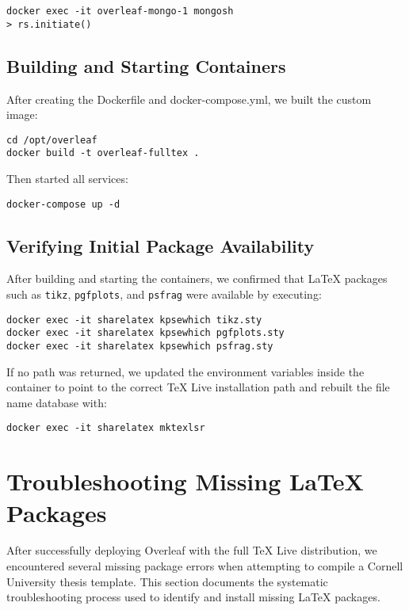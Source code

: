 \begin{verbatim}
docker exec -it overleaf-mongo-1 mongosh
> rs.initiate()
\end{verbatim}

\subsection{Building and Starting Containers}

After creating the Dockerfile and docker-compose.yml, we built the custom image:

\begin{verbatim}
cd /opt/overleaf
docker build -t overleaf-fulltex .
\end{verbatim}

Then started all services:

\begin{verbatim}
docker-compose up -d
\end{verbatim}

\subsection{Verifying Initial Package Availability}

After building and starting the containers, we confirmed that LaTeX packages such as \verb|tikz|, \verb|pgfplots|, and \verb|psfrag| were available by executing:

\begin{verbatim}
docker exec -it sharelatex kpsewhich tikz.sty
docker exec -it sharelatex kpsewhich pgfplots.sty
docker exec -it sharelatex kpsewhich psfrag.sty
\end{verbatim}

If no path was returned, we updated the environment variables inside the container to point to the correct \TeX{} Live installation path and rebuilt the file name database with:

\begin{verbatim}
docker exec -it sharelatex mktexlsr
\end{verbatim}

\section{Troubleshooting Missing LaTeX Packages}

After successfully deploying Overleaf with the full \TeX{} Live distribution, we encountered several missing package errors when attempting to compile a Cornell University thesis template. This section documents the systematic troubleshooting process used to identify and install missing LaTeX packages.

